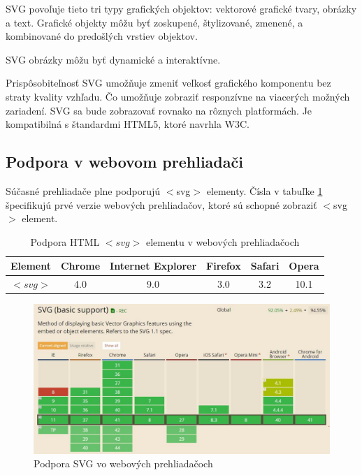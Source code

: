  SVG povoľuje tieto tri typy grafických objektov: vektorové grafické tvary, obrázky a text. 
Grafické objekty môžu byť zoskupené, štylizované, zmenené, a kombinované do predošlých vrstiev objektov. 

SVG obrázky môžu byť dynamické a interaktívne.

Prispôsobiteľnosť SVG umožňuje zmeniť veľkosť grafického komponentu bez straty kvality vzhľadu. Čo umožňuje zobraziť responzívne na viacerých možných zariadení. 
SVG sa bude zobrazovať rovnako na rôznych platformách. Je kompatibilná s štandardmi \acs{HTML}5, ktoré navrhla \ac*{W3C}. 


 \subsection{Podpora v webovom prehliadači}
 Súčasné prehliadače plne podporujú $<$svg$>$ elementy.  
  Čísla v tabuľke \ref{svgpreh} špecifikujú prvé verzie webových prehliadačov, ktoré sú schopné zobraziť $<$svg$>$ element.\cite{w3svg}
  
\begin{table}[hp]
\begin{center}
		\begin{tabular}{|c|c|c|c|c|c|}
		\hline \textbf{Element} & \textbf{Chrome} & \textbf{Internet} \textbf{Explorer}  & \textbf{Firefox}  & \textbf{Safari} & \textbf{Opera}  \\ 
		\hline $<svg>$ & 4.0& 9.0 & 3.0 & 3.2  &   10.1 \\ 
		\hline 
	\end{tabular} 
\end{center}
	
	\caption{Podpora HTML $<svg>$ elementu v webových prehliadačoch}
	\label{svgpreh}
\end{table}
 
 \begin{figure}[hp]
\centering
\includegraphics[width=0.7\linewidth]{obrazky/podpora}
\caption{Podpora SVG vo webových prehliadačoch}
\label{fig:podpora}
\end{figure}
 
